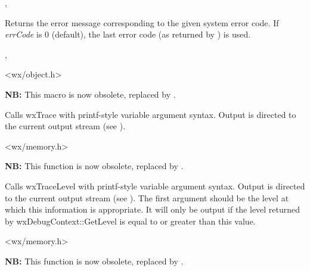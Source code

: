 
,


\label{wxsyserrormsg}


Returns the error message corresponding to the given system error code. If
{\it errCode} is $0$ (default), the last error code (as returned by
) is used.


,


\label{trace}


<wx/object.h>


{\bf NB:} This macro is now obsolete, replaced by .

Calls wxTrace with printf-style variable argument syntax. Output
is directed to the current output stream (see ).


<wx/memory.h>


\label{tracelevel}


{\bf NB:} This function is now obsolete, replaced by .

Calls wxTraceLevel with printf-style variable argument syntax. Output
is directed to the current output stream (see ).
The first argument should be the level at which this information is appropriate.
It will only be output if the level returned by wxDebugContext::GetLevel is equal to or greater than
this value.


<wx/memory.h>


\label{wxtrace}


{\bf NB:} This function is now obsolete, replaced by .

